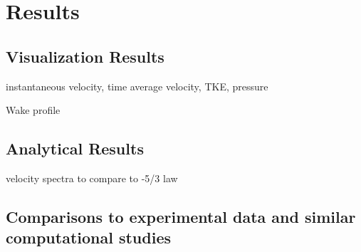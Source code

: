 \section{Results}

\subsection{Visualization Results}

instantaneous velocity, time average velocity, TKE, pressure

Wake profile

\subsection{Analytical Results}

velocity spectra to compare to -5/3 law

\subsection{Comparisons to experimental data and similar computational studies}

